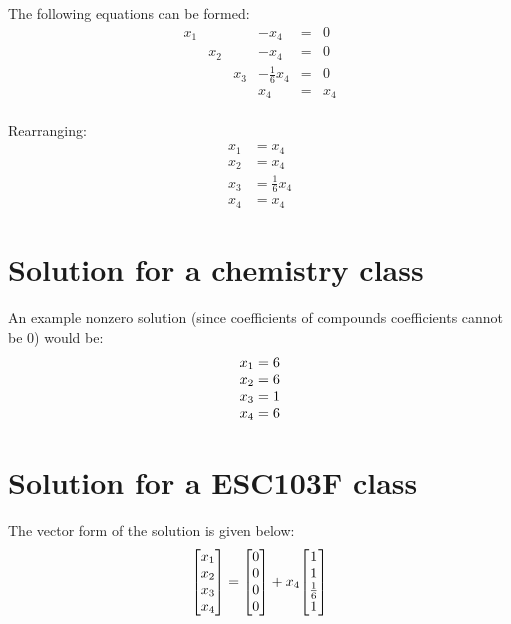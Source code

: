 \documentclass[11pt]{article}
\begin{document}
The following equations can be formed:
\begin{equation*}
    \begin{array}{cccccc}
        x_1 & & & -x_4 & =  & 0\\
        & x_2 & & -x_4 & = & 0\\
        & & x_3 & -\frac{1}{6}x_4 & = & 0\\
        & & & x_4 & = & x_4\\
    \end{array}
\end{equation*}

Rearranging:
\begin{align*}
    x_1 &= x_4 \\
    x_2 &= x_4 \\
    x_3 &= \frac{1}{6}x_4 \\
    x_4 &= x_4
\end{align*}

\section{Solution for a chemistry class}
An example nonzero solution (since coefficients of compounds coefficients cannot be 0) would be:
\begin{equation*}
    \begin{array}{@{}c@{}}
        x_1 = 6 \\
        x_2 = 6 \\
        x_3 = 1 \\
        x_4 = 6
    \end{array}
\end{equation*}

\section{Solution for a ESC103F class}
The vector form of the solution is given below:
\begin{align*}
    \left[
        \begin{array}{@{}c@{}}
            x_1\\
            x_2\\
            x_3\\
            x_4
        \end{array}
    \right] =
    \left[
        \begin{array}{@{}c@{}}
            0 \\
            0 \\
            0 \\
            0
        \end{array}
    \right] +
    x_4\!\left[
        \begin{array}{@{}c@{}}
            1 \\
            1 \\
            \frac{1}{6} \\
            1
        \end{array}
    \right]
\end{align*}
\end{document}
